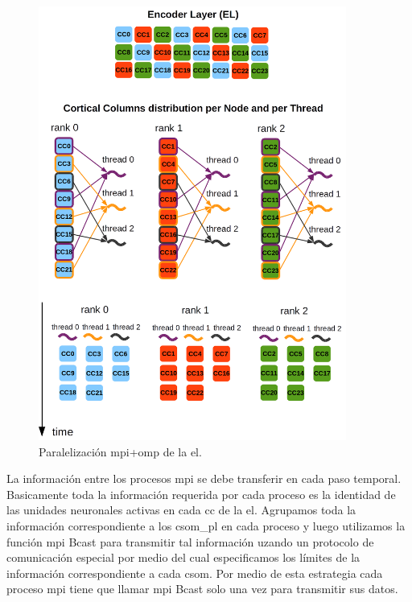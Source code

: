 {\begin{figure}[h!]
    \centering
    \includegraphics[width=0.9\textwidth]{Encoder_Parallelization.png}
    \caption{Paralelización \gls{mpi}+\gls{omp} de la \gls{el}.}
    \label{fig:Encoder_Parallelization}
\end{figure}

La información entre los procesos \gls{mpi} se debe transferir en cada paso temporal.
Basicamente toda la información requerida por cada proceso es la identidad de las unidades neuronales activas en cada \gls{cc} de la \gls{el}.
Agrupamos toda la información correspondiente a los \gls{csom_pl} en cada proceso y luego utilizamos la función \gls{mpi} Bcast para transmitir tal información uzando un protocolo de comunicación especial por medio del cual especificamos los límites de la información correspondiente a cada \gls{csom}.
Por medio de esta estrategia cada proceso \gls{mpi} tiene que llamar \gls{mpi} Bcast solo una vez para transmitir sus datos.

}
